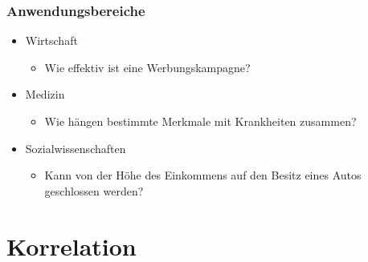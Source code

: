 \documentclass{beamer}
\begin{document}
\begin{frame}
 \frametitle{Anwendungsbereiche}

 \begin{itemize}
  \item Wirtschaft
  \begin{itemize}
   \item Wie effektiv ist eine Werbungskampagne?
  \end{itemize}

  \item Medizin
  \begin{itemize}
   \item Wie h\"angen bestimmte Merkmale mit Krankheiten zusammen?
  \end{itemize}

  \item Sozialwissenschaften
  \begin{itemize}
   \item Kann von der H\"ohe des Einkommens auf den Besitz eines Autos geschlossen werden?
  \end{itemize}


 \end{itemize}

\end{frame}

\section{Korrelation}
\end{document}
